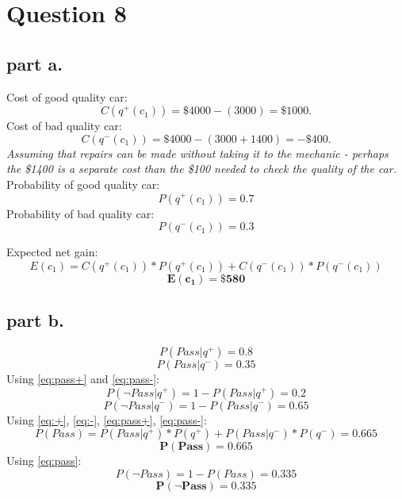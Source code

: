 \section{Question 8}

\subsection{part a.}
Cost of good quality car:
\begin{equation}
\label{eq:c+}
C(q^+(c_1)) = \$ 4000 - (3000) = \$1000.
\end{equation}
Cost of bad quality car:
\begin{equation}
\label{eq:c-}
C(q^-(c_1)) = \$ 4000 - (3000 + 1400) = -\$400. 
\end{equation}
\textit{Assuming that repairs can be made without taking it to the mechanic - perhaps the \$1400 is a separate cost than the \$100 needed to check the quality of the car.} \\
Probability of good quality car:
\begin{equation}
\label{eq:+}
	P(q^+(c_1)) = 0.7
\end{equation}
Probability of bad quality car:
\begin{equation}
\label{eq:-}
	P(q^-(c_1)) = 0.3
\end{equation}

Expected net gain:
\[E(c_1) = C(q^+(c_1))*P(q^+(c_1)) + C(q^-(c_1))*P(q^-(c_1))\]
\begin{equation} 
\label{eq:expected_value} 
\mathbf{E(c_1) = \$580} 
\end{equation}


\subsection{part b.}

\begin{equation}
\label{eq:pass+}
	P(Pass | q^+) = 0.8
\end{equation}
\begin{equation}
\label{eq:pass-}
	P(Pass | q^-) = 0.35
\end{equation}
Using \ref{eq:pass+} and \ref{eq:pass-}:
\begin{equation}
\label{eq:npass+}
	P(\neg Pass | q^+) = 1 - P(Pass | q^+) = 0.2
\end{equation}
\begin{equation}
\label{eq:npass-}
	P(\neg Pass | q^-) = 1 - P(Pass | q^-) = 0.65
\end{equation}
Using \ref{eq:+}, \ref{eq:-}, \ref{eq:pass+}, \ref{eq:pass-}:
\[P(Pass) = P(Pass | q^+) * P(q^+) + P(Pass | q^-) * P(q^-) = 0.665\]
\begin{equation}
\label{eq:pass}
	\mathbf{P(Pass) = 0.665}
\end{equation}
Using \ref{eq:pass}:
\[P(\neg Pass) = 1 - P(Pass) = 0.335  \]
\begin{equation}
\label{eq:npass}
	\mathbf{P(\neg Pass) = 0.335}
\end{equation}


